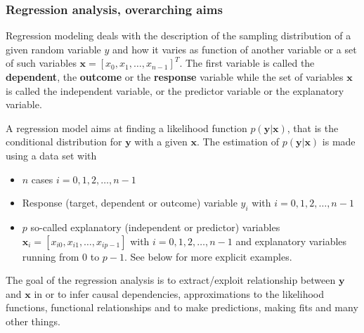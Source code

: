 \documentclass{beamer}
\begin{document}
\begin{frame}
\frametitle{Regression analysis, overarching aims}

\begin{block}{}

Regression modeling deals with the description of  the sampling distribution of a given random variable $y$ and how it varies as function of another variable or a set of such variables $\bm{x} =[x_0, x_1,\dots, x_{n-1}]^T$. 
The first variable is called the \textbf{dependent}, the \textbf{outcome} or the \textbf{response} variable while the set of variables $\bm{x}$ is called the independent variable, or the predictor variable or the explanatory variable. 

A regression model aims at finding a likelihood function $p(\bm{y}\vert \bm{x})$, that is the conditional distribution for $\bm{y}$ with a given $\bm{x}$. The estimation of  $p(\bm{y}\vert \bm{x})$ is made using a data set with 
\begin{itemize}
\item $n$ cases $i = 0, 1, 2, \dots, n-1$ 

\item Response (target, dependent or outcome) variable $y_i$ with $i = 0, 1, 2, \dots, n-1$ 

\item $p$ so-called explanatory (independent or predictor) variables $\bm{x}_i=[x_{i0}, x_{i1}, \dots, x_{ip-1}]$ with $i = 0, 1, 2, \dots, n-1$ and explanatory variables running from $0$ to $p-1$. See below for more explicit examples.   
\end{itemize}

\noindent
 The goal of the regression analysis is to extract/exploit relationship between $\bm{y}$ and $\bm{x}$ in or to infer causal dependencies, approximations to the likelihood functions, functional relationships and to make predictions, making fits and many other things.
\end{block}
\end{frame}
\end{document}
